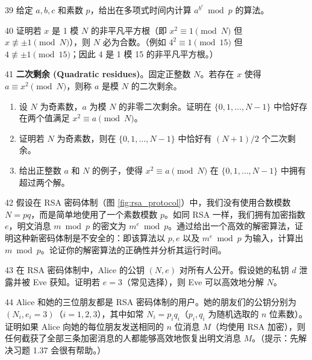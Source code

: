 \begin{exercise}{39}
给定 $a, b, c$ 和素数 $p$，给出在多项式时间内计算 $a^{b^c} \bmod p$ 的算法。
\end{exercise}

\begin{exercise}{40}
证明若 $x$ 是 1 模 $N$ 的非平凡平方根（即 $x^2 \equiv 1 \pmod N$ 但 $x \not\equiv \pm 1 \pmod N$），则 $N$ 必为合数。（例如 $4^2 \equiv 1 \pmod{15}$ 但 $4 \not\equiv \pm 1 \pmod{15}$；因此 4 是 1 模 15 的非平凡平方根。）
\end{exercise}

\begin{exercise}{41}
\textbf{二次剩余 (Quadratic residues)}。固定正整数 $N$。若存在 $x$ 使得 $a \equiv x^2 \pmod N$，则称 $a$ 是模 $N$ 的二次剩余。
\begin{enumerate}
    \item[(a)] 设 $N$ 为奇素数，$a$ 为模 $N$ 的非零二次剩余。证明在 $\{0, 1, \dots, N-1\}$ 中恰好存在两个值满足 $x^2 \equiv a \pmod N$。
    \item[(b)] 证明若 $N$ 为奇素数，则在 $\{0, 1, \dots, N-1\}$ 中恰好有 $(N + 1)/2$ 个二次剩余。
    \item[(c)] 给出正整数 $a$ 和 $N$ 的例子，使得 $x^2 \equiv a \pmod N$ 在 $\{0, 1, \dots, N-1\}$ 中拥有超过两个解。
\end{enumerate}
\end{exercise}

\begin{exercise}{42}
假设在 RSA 密码体制（图 \ref{fig:rsa_protocol}）中，我们没有使用合数模数 $N = pq$，而是简单地使用了一个素数模数 $p$。如同 RSA 一样，我们拥有加密指数 $e$，明文消息 $m \bmod p$ 的密文为 $m^e \bmod p$。通过给出一个高效的解密算法，证明这种新密码体制是不安全的：即该算法以 $p, e$ 以及 $m^e \bmod p$ 为输入，计算出 $m \bmod p$。论证你的解密算法的正确性并分析其运行时间。
\end{exercise}

\begin{exercise}{43}
在 RSA 密码体制中，Alice 的公钥 $(N, e)$ 对所有人公开。假设她的私钥 $d$ 泄露并被 Eve 获知。证明若 $e = 3$（常见选择），则 Eve 可以高效地分解 $N$。
\end{exercise}

\begin{exercise}{44}
Alice 和她的三位朋友都是 RSA 密码体制的用户。她的朋友们的公钥分别为 $(N_i, e_i = 3)$（$i = 1, 2, 3$），其中如常 $N_i = p_i q_i$（$p_i, q_i$ 为随机选取的 $n$ 位素数）。证明如果 Alice 向她的每位朋友发送相同的 $n$ 位消息 $M$（均使用 RSA 加密），则任何截获了全部三条加密消息的人都能够高效地恢复出明文消息 $M$。（提示：先解决习题 1.37 会很有帮助。）
\end{exercise}


